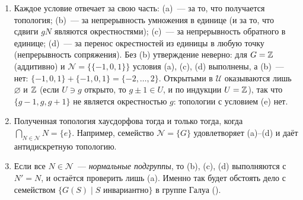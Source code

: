 \begin{remark}[7.2a]
\begin{enumerate}[label=(\alph*),leftmargin=*]
\item Каждое условие отвечает за свою часть: (a)~--- за то, что получается топология; (b)~--- за непрерывность умножения
в единице (и за то, что сдвиги $gN$ являются окрестностями); (c)~--- за непрерывность обратного в единице; (d)~--- за
перенос окрестностей из единицы в любую точку (непрерывность сопряжения). Без (b) утверждение неверно: для $G=\mathbb Z$ (аддитивно) и
$\mathcal N=\{\{-1,0,1\}\}$ условия (a), (c), (d) выполнены, а (b)~--- нет: $\{-1,0,1\}+\{-1,0,1\}=\{-2,\dots,2\}$.
Открытыми в $\mathcal U$ оказываются лишь $\varnothing$ и $\mathbb Z$ (если $U\ni g$ открыто, то $g\pm1\in U$, и по индукции
$U=\mathbb Z$), так что $\{g-1,g,g+1\}$ не является окрестностью $g$: топологии с условием (e) нет.
\item Полученная топология хаусдорфова тогда и только тогда, когда $\bigcap_{N\in\mathcal N}N=\{e\}$. Например,
семейство $\mathcal N=\{G\}$ удовлетворяет (a)--(d) и даёт антидискретную топологию.
\item Если все $N\in\mathcal N$~--- \emph{нормальные подгруппы}, то (b), (c), (d) выполняются с $N'=N$, и остаётся
проверить лишь (a). Именно так будет обстоять дело с семейством $\{G(S)\mid S\text{ инвариантно}\}$ в группе Галуа ().
\end{enumerate}
\end{remark}
